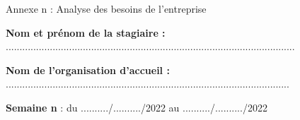 \documentclass[a4paper,11pt]{article}
\makeatletter
\newcommand{\mktitle}{\@maketitle}
\makeatother
\begin{document}
\begin{center}\LARGE Annexe n : Analyse des besoins de l'entreprise\end{center}
\newpage

\mktitle\vspace{-.2cm}

\noindent\textbf{Nom et prénom de la stagiaire :} .........................................................................................................\vspace{.4cm}

\noindent\textbf{Nom de l'organisation d'accueil :} .......................................................................................................\vspace{.4cm}

\noindent\textbf{Semaine n} : du ........../........../2022 au ........../........../2022\vspace{-.2cm}
\end{document}
